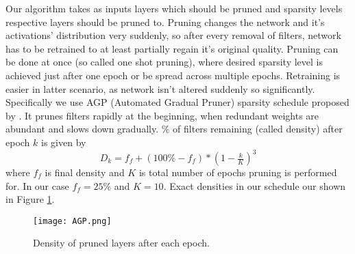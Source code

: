 \documentclass[../Main.tex]{subfiles}
\begin{document}
    Our algorithm takes as inputs layers which should be pruned and sparsity levels
    respective layers should be pruned to. Pruning changes the network and it's activations' distribution
    very suddenly, so after every removal of filters, network has to be retrained to 
    at least partially regain it's original quality. Pruning can be done at once 
    (so called one shot pruning), 
    where desired sparsity level is achieved just after one epoch or be 
    spread across multiple epochs.  Retraining is easier in latter scenario,
    as network isn't altered suddenly so significantly. Specifically we use AGP (Automated
    Gradual Pruner) sparsity schedule proposed by \cite{zhu2017prune}. It prunes
    filters rapidly at the beginning, when redundant weights are abundant
    and slows down gradually. \% of filters remaining (called density) after epoch 
    $k$ is given by
    \[ D_k = f_f + (100\%-f_f)*(1-\tfrac{k}{K})^3 \]
    where $f_f$ is final density and $K$ is total number of epochs
    pruning is performed for. In our case $f_f=25\%$ and $K=10$. Exact densities
    in our schedule our shown in Figure \ref{fig:AGP}. 
    
    
        \begin{figure}[ht!]
            \texttt{[image: AGP.png]}
            \caption{Density of pruned layers after each epoch.}
            \label{fig:AGP}
        \end{figure}
        

    
\end{document}
